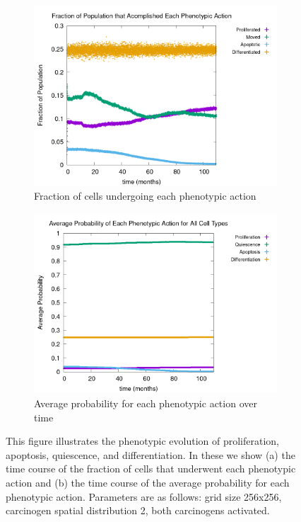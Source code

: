 \documentclass[\main/thesis.tex]{subfiles}
\begin{document}
\begin{figure}[H]
    \centering
    \begin{subfigure}[t]{.65\textwidth}
      \centering
      \includegraphics[width=\textwidth]{images/2_GeneralObservations/Fig3/numPheno_all.png}
      \caption{Fraction of cells undergoing each phenotypic action}
      \label{fig:GeneralObservations_numPheno}
    \end{subfigure}
    \begin{subfigure}[t]{.65\textwidth}
      \centering
      \includegraphics[width=\textwidth]{images/2_GeneralObservations/Fig3/chancePheno_all.png}
      \caption{Average probability for each phenotypic action over time}
      \label{fig:GeneralObservations_chancePheno}
    \end{subfigure}
    \caption{This figure illustrates the phenotypic evolution of proliferation, apoptosis, quiescence, and differentiation. In these we show (a) the time course of the fraction of cells that underwent each phenotypic action and (b) the time course of the average probability for each phenotypic action. Parameters are as follows: grid size 256x256, carcinogen spatial distribution 2, both carcinogens activated.}
    \label{fig:GeneralObservations_PhenoEvo}
\end{figure}
\end{document}
